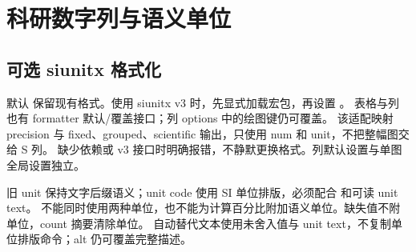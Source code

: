 \section{科研数字列与语义单位}
\subsection{可选 siunitx 格式化}
默认  保留现有格式。使用 siunitx v3 时，先显式加载宏包，再设置 。
表格与列也有 formatter 默认/覆盖接口；列 options 中的绘图键仍可覆盖。
该适配映射 precision 与 fixed、grouped、scientific 输出，只使用 num 和 unit，不把整幅图交给 S 列。
缺少依赖或 v3 接口时明确报错，不静默更换格式。列默认设置与单图全局设置独立。
\begin{codeonly}
\usepackage{siunitx}
\usepackage{gradbars}
\end{codeonly}
旧 unit 保持文字后缀语义；unit code 使用 SI 单位排版，必须配合  和可读 unit text。
不能同时使用两种单位，也不能为计算百分比附加语义单位。缺失值不附单位，count 摘要清除单位。
自动替代文本使用未舍入值与 unit text，不复制单位排版命令；alt 仍可覆盖完整描述。
